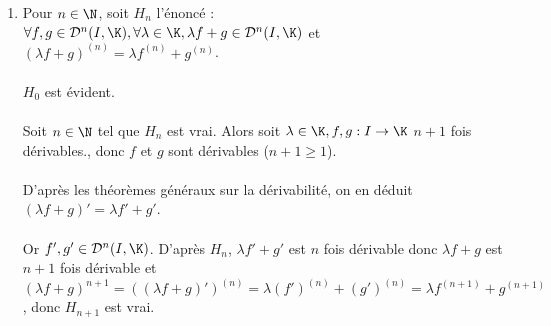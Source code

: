 \documentclass[12pt,a4paper]{report}
\begin{document}
\begin{demo} \footnotemark
\begin{enumerate}
	\item Pour $n \in \N$, soit $H_n$ l'énoncé : \\
	$\forall f,g \in \mathcal{D}^{n}(I,\K), \forall \lambda \in \K, \lambda f+g \in \mathcal{D}^n(I,\K)$ et $(\lambda f+g)^{(n)} = \lambda f^{(n)} + g^{(n)}$. \\ \\
	$H_0$ est évident. \\ \\
	Soit $n \in \N$ tel que $H_n$ est vrai. Alors soit $\lambda \in \K, f,g : I \to \K$ $n+1$ fois dérivables., donc $f$ et $g$ sont dérivables ($n+1 \geq 1$). \\ \\
	D'après les théorèmes généraux sur la dérivabilité, on en déduit $(\lambda f + g)' = \lambda f' + g'$. \\ \\
	Or $f', g' \in \mathcal{D}^n(I,\K)$. D'après $H_n$, $\lambda f' + g'$ est $n$ fois dérivable donc $\lambda f + g$ est $n+1$ fois dérivable et \\
	$(\lambda f + g)^{n+1} = ((\lambda f + g)') ^{(n)} = \lambda (f')^{(n)} + (g')^{(n)} = \lambda f^{(n+1)} + g^{(n+1)}$, donc $H_{n+1}$ est vrai. \\
	

\end{enumerate}
\end{demo}
\end{document}
